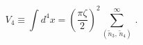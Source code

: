 \begin{equation}
V_4 \equiv \int d^4x =\left( \frac{\pi\zeta}{2}\right)^2 
 \sum_{(\tilde{n}_3,\,\tilde{n}_4)}^{\infty}\,.\label{eq:4.1.19}
\end{equation}

